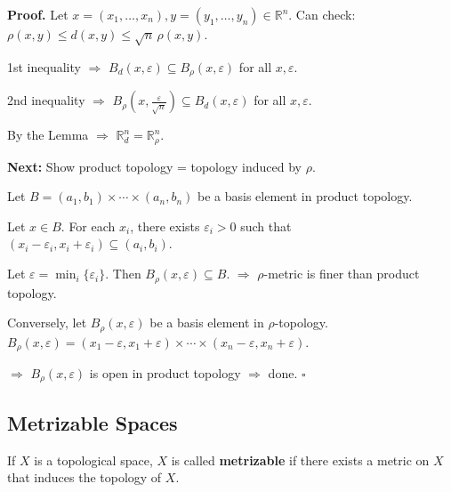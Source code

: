 \documentclass[11pt]{report}
\renewenvironment{proof}[1][Proof]{\noindent\textbf{#1.} }{\hfill$\square$\par\vspace{5pt}}
\begin{document}
\begin{proof}
Let $x = (x_1, \ldots, x_n), y = (y_1, \ldots, y_n) \in \mathbb{R}^n$. Can check: $\rho(x,y) \leq d(x,y) \leq \sqrt{n}\,\rho(x,y)$.

1st inequality $\Rightarrow$ $B_d(x, \varepsilon) \subseteq B_\rho(x, \varepsilon)$ for all $x, \varepsilon$.

2nd inequality $\Rightarrow$ $B_\rho(x, \frac{\varepsilon}{\sqrt{n}}) \subseteq B_d(x, \varepsilon)$ for all $x, \varepsilon$.

By the Lemma $\Rightarrow$ $\mathbb{R}^n_d = \mathbb{R}^n_\rho$.

\textbf{Next:} Show product topology = topology induced by $\rho$.

Let $B = (a_1, b_1) \times \cdots \times (a_n, b_n)$ be a basis element in product topology.

Let $x \in B$. For each $x_i$, there exists $\varepsilon_i > 0$ such that $(x_i - \varepsilon_i, x_i + \varepsilon_i) \subseteq (a_i, b_i)$.

Let $\varepsilon = \min_i\{\varepsilon_i\}$. Then $B_\rho(x, \varepsilon) \subseteq B$. $\Rightarrow$ $\rho$-metric is finer than product topology.

Conversely, let $B_\rho(x, \varepsilon)$ be a basis element in $\rho$-topology. $B_\rho(x, \varepsilon) = (x_1 - \varepsilon, x_1 + \varepsilon) \times \cdots \times (x_n - \varepsilon, x_n + \varepsilon)$.

$\Rightarrow$ $B_\rho(x, \varepsilon)$ is open in product topology $\Rightarrow$ done.
\end{proof}

\subsection{Metrizable Spaces}

\begin{defbox}[Metrizable]
If $X$ is a topological space, $X$ is called \textbf{metrizable} if there exists a metric on $X$ that induces the topology of $X$.
\end{defbox}
\end{document}
